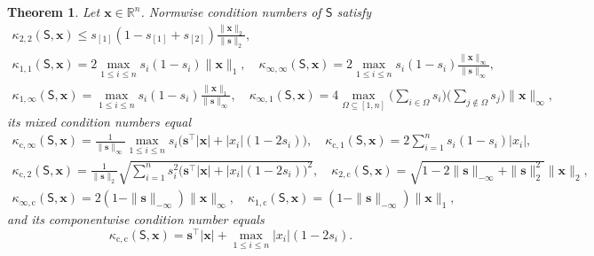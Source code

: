 \documentclass[namedate,webpdf,imanum]{ima-authoring-template}
\newcommand{\Real}{\mathbb{R}}
\newcommand{\Matrix}[1]{\mathbf{#1}}
\newcommand{\trans}{\intercal}
\newcommand{\Norm}[3][]{#1\| #2 #1\|_{\mathrm{#3}}}
\newcommand{\Layer}[1]{\mathsf{#1}}
\newcommand{\cond}[3][]{\kappa_{\mathrm{#2}} #1( #3 #1)}
\newtheorem{theorem}{Theorem}[section]%
\numberwithin{equation}{section}
\begin{document}
\begin{theorem}
\label{theorem:cond-softmax}
Let $\Matrix{x} \in \Real^n$.
Normwise condition numbers of $\Layer{S}$ satisfy
\begin{gather*}
    \cond{2,2}{\Layer{S}, \Matrix{x}} \leq s_{[1]} (1 - s_{[1]} + s_{[2]}) \frac{\Norm{\Matrix{x}}{2}}{\Norm{\Matrix{s}}{2}}, \\
    \cond{1,1}{\Layer{S}, \Matrix{x}} = 2 \max_{1 \leq i \leq n} s_i (1 - s_i) \Norm{\Matrix{x}}{1}, \quad \cond{\infty,\infty}{\Layer{S}, \Matrix{x}} = 2 \max_{1 \leq i \leq n} s_i (1 - s_i) \frac{\Norm{\Matrix{x}}{\infty}}{\Norm{\Matrix{s}}{\infty}}, \\
    \cond{1,\infty}{\Layer{S}, \Matrix{x}} = \max_{1 \leq i \leq n} s_i (1 - s_i) \frac{\Norm{\Matrix{x}}{1}}{\Norm{\Matrix{s}}{\infty}}, \quad \cond{\infty,1}{\Layer{S}, \Matrix{x}} = 4 \max_{\Omega \subseteq [1,n]} \bigg( \sum_{i \in \Omega} s_i \bigg) \bigg( \sum_{j \not\in \Omega} s_j \bigg) \Norm{\Matrix{x}}{\infty},
\end{gather*}
its mixed condition numbers equal
\begin{gather*}
    \cond{c,\infty}{\Layer{S}, \Matrix{x}} = \frac{1}{\Norm{\Matrix{s}}{\infty}} \max_{1 \leq i \leq n} s_i \big( \Matrix{s}^\trans |\Matrix{x}| + |x_i| (1 - 2 s_i) \big), \quad \cond{c,1}{\Layer{S}, \Matrix{x}} = 2 \sum_{i = 1}^n s_i (1 - s_i) |x_i|, \\
    \cond{c,2}{\Layer{S}, \Matrix{x}} = \frac{1}{\Norm{\Matrix{s}}{2}} \sqrt{\sum_{i = 1}^n s_i^2 \big( \Matrix{s}^\trans |\Matrix{x}| + |x_i| (1 - 2 s_i) \big)^2}, \quad \cond{2,c}{\Layer{S}, \Matrix{x}} = \sqrt{1 - 2 \Norm{\Matrix{s}}{-\infty} + \Norm{\Matrix{s}}{2}^2} \Norm{\Matrix{x}}{2}, \\
    \cond{\infty, c}{\Layer{S}, \Matrix{x}} = 2 (1 - \Norm{\Matrix{s}}{-\infty}) \Norm{\Matrix{x}}{\infty}, \quad \cond{1, c}{\Layer{S}, \Matrix{x}} = (1 - \Norm{\Matrix{s}}{-\infty}) \Norm{\Matrix{x}}{1},
\end{gather*}
and its componentwise condition number equals
\begin{equation*}
    \cond{c,c}{\Layer{S}, \Matrix{x}} = \Matrix{s}^\trans |\Matrix{x}| + \max_{1 \leq i \leq n} |x_i| (1 - 2 s_i). 
\end{equation*}
\end{theorem}
\end{document}
